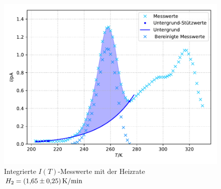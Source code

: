 \begin{figure}[H]
  \centering
  \includegraphics[scale=0.7]{content/plot4.pdf}
  \caption{Integrierte $I(T)$-Messwerte mit der Heizrate $H_2 = \SI{1.65 +- 0.25}{\kelvin\per\minute}$}
  \label{fig:plot4}
\end{figure}


